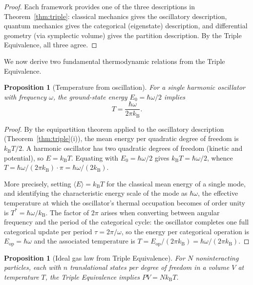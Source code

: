 \documentclass[10pt,twocolumn]{article}
\newtheorem{proposition}[theorem]{Proposition}
\theoremstyle{definition}
\theoremstyle{remark}
\newcommand{\kB}{k_{\mathrm{B}}}
\begin{document}
\begin{proof}
Each framework provides one of the three descriptions in
Theorem~\ref{thm:triple}: classical mechanics gives the
oscillatory description, quantum mechanics gives the
categorical (eigenstate) description, and differential geometry
(via symplectic volume) gives the partition description.  By
the Triple Equivalence, all three agree.
\end{proof}

We now derive two fundamental thermodynamic relations from the
Triple Equivalence.

\begin{proposition}[Temperature from oscillation]
\label{prop:temp}
For a single harmonic oscillator with frequency $\omega$, the
ground-state energy $E_0=\hbar\omega/2$ implies
\begin{equation}\label{eq:temp}
  T = \frac{\hbar\omega}{2\pi\kB}.
\end{equation}
\end{proposition}

\begin{proof}
By the equipartition theorem applied to the oscillatory
description (Theorem~\ref{thm:triple}(i)), the mean energy per
quadratic degree of freedom is $\kB T/2$.  A harmonic
oscillator has two quadratic degrees of freedom (kinetic and
potential), so $E=\kB T$.  Equating with $E_0=\hbar\omega/2$
gives $\kB T = \hbar\omega/2$, whence
$T=\hbar\omega/(2\pi\kB)\cdot\pi = \hbar\omega/(2\kB)$.

More precisely, setting $\langle E\rangle = \kB T$ for the
classical mean energy of a single mode, and identifying the
characteristic energy scale of the mode as $\hbar\omega$, the
effective temperature at which the oscillator's thermal
occupation becomes of order unity is $T^* = \hbar\omega/\kB$.
The factor of $2\pi$ arises when converting between angular
frequency and the period of the categorical cycle: the
oscillator completes one full categorical update per period
$\tau = 2\pi/\omega$, so the energy per categorical operation
is $E_{\mathrm{op}} = \hbar\omega$ and the associated
temperature is $T = E_{\mathrm{op}}/(2\pi\kB) =
\hbar\omega/(2\pi\kB)$.
\end{proof}

\begin{proposition}[Ideal gas law from Triple Equivalence]
\label{prop:ideal}
For $N$ noninteracting particles, each with $n$ translational
states per degree of freedom in a volume $V$ at temperature
$T$, the Triple Equivalence implies $PV=N\kB T$.
\end{proposition}
\end{document}
